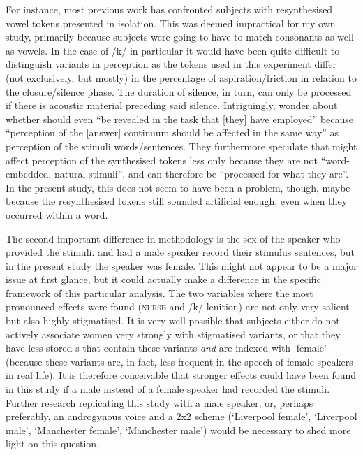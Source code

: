 For instance, most previous work has confronted subjects with resynthesised vowel tokens presented in isolation.
This was deemed impractical for my own study, primarily because subjects were going to have to match consonants as well as vowels.
In the case of /k/ in particular it would have been quite difficult to distinguish variants in perception as the tokens used in this experiment differ (not exclusively, but mostly) in the percentage of aspiration/friction in relation to the closure/silence phase.
The duration of silence, in turn, can only be processed if there is acoustic material preceding said silence.
Intriguingly, \textcite[887--888]{haydrager2010} wonder about whether  should even ``be revealed in the task that [they] have employed'' because ``perception of the [answer] continuum should be affected in the same way'' as perception of the stimuli words/sentences.
They furthermore speculate that  might affect perception of the synthesised tokens less only because they are not ``word-embedded, natural stimuli'', and can therefore be ``processed for what they are''.
In the present study, this does not seem to have been a problem, though, maybe because the resynthesised tokens still sounded artificial enough, even when they occurred within a word.

The second important difference in methodology is the sex of the speaker who provided the stimuli.
\textcite{hayetal2006a} and \textcite{haydrager2010} had a male speaker record their stimulus sentences, but in the present study the speaker was female.
This might not appear to be a major issue at first glance, but it could actually make a difference in the specific framework of this particular analysis.
The two variables where the most pronounced  effects were found (\textsc{nurse} and /k/-lenition) are not only very salient but also highly stigmatised.
It is very well possible that subjects either do not actively associate women very strongly with stigmatised variants, or that they have less stored s that contain these variants \emph{and} are indexed with `female' (because these variants are, in fact, less frequent in the speech of female speakers in real life).
It is therefore conceivable that stronger  effects could have been found in this study if a male instead of a female speaker had recorded the stimuli.
Further research replicating this study with a male speaker, or, perhaps preferably, an androgynous voice and a 2x2  scheme (`Liverpool female', `Liverpool male', `Manchester female', `Manchester male') would be necessary to shed more light on this question.

